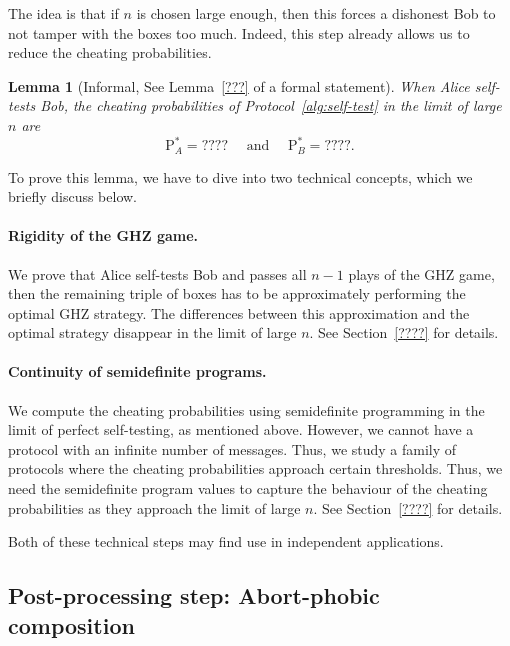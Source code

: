 \documentclass[11pt]{article}
\newtheorem{lemma}[theorem]{Lemma}
\newcommand{\PB}{\mathrm{P}_B^*}
\newcommand{\PA}{\mathrm{P}_A^*}
\begin{document}
The idea is that if $n$ is chosen large enough, then this forces a dishonest Bob to not tamper with the boxes too much. 
Indeed, this step already allows us to reduce the cheating probabilities. 

\begin{lemma} [Informal, See Lemma~\ref{???} of a formal statement] 
When Alice self-tests Bob, the cheating probabilities  of Protocol~\ref{alg:self-test} in the limit of large $n$ are  
\begin{equation} 
\PA = ???? \quad \text{ and } \quad \PB = ????. 
\end{equation} 
\end{lemma}  

To prove this lemma, we have to dive into two technical concepts, which we briefly discuss below. 

\paragraph{Rigidity of the GHZ game.} 
We prove that Alice self-tests Bob and passes all $n-1$ plays of the GHZ game, then the remaining triple of boxes has to be approximately performing the optimal GHZ strategy. 
The differences between this approximation and the optimal strategy disappear in the limit of large $n$. 
See Section~\ref{????} for details. 

\paragraph{Continuity of semidefinite programs.} 
We compute the cheating probabilities using semidefinite programming in the limit of perfect self-testing, as mentioned above. 
However, we cannot have a protocol with an infinite number of messages. 
Thus, we study a family of protocols where the cheating probabilities approach certain thresholds. 
Thus, we need the semidefinite program values to capture the behaviour of the cheating probabilities as they approach the limit of large $n$.  
See Section~\ref{????} for details. 

Both of these technical steps may find use in independent applications. 


\subsection{Post-processing step: Abort-phobic composition} 
\end{document}
